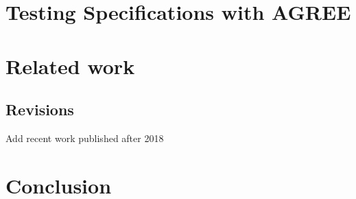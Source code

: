 \documentclass[global,twocolumn]{svjour}
\begin{document}
\section{Testing Specifications with AGREE}
\label{sec:testing}


\section{Related work}
\label{sec:related-work}


\subsection{Revisions}
\begin{compactitem}
  \item Add recent work published after 2018
\end{compactitem}

\section{Conclusion}
\label{sec:conclusion}


\clearpage



% 

% 
\end{document}
